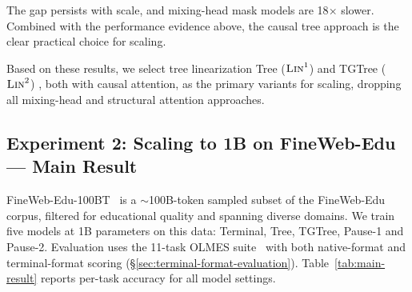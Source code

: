 \documentclass[11pt]{article}
\begin{document}
The gap persists with scale, and mixing-head mask models are 18$\times$ slower.
Combined with the performance evidence above, the causal tree approach is the clear practical choice for scaling.

Based on these results, we select tree linearization Tree ($\textsc{Lin}^1$) and TGTree ($\textsc{Lin}^2$) , both with causal attention, as the primary variants for scaling, dropping all mixing-head and structural attention approaches.

\subsection{Experiment 2: Scaling to 1B on FineWeb-Edu --- Main Result}

FineWeb-Edu-100BT~\cite{penedo2024fineweb} is a $\sim$100B-token sampled subset of the FineWeb-Edu corpus, filtered for educational quality and spanning diverse domains.
We train five models at 1B parameters on this data: Terminal, Tree, TGTree, Pause-1 and Pause-2.
Evaluation uses the 11-task OLMES suite~\cite{gu-etal-2025-olmes} with both native-format and terminal-format scoring (\S\ref{sec:terminal-format-evaluation}). Table~\ref{tab:main-result} reports per-task accuracy for all model settings.
\end{document}
